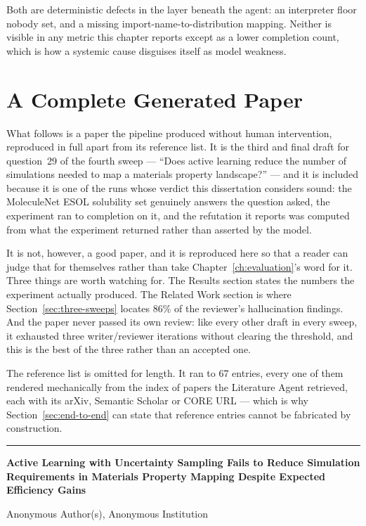 Both are deterministic defects in the layer beneath the agent: an interpreter floor
nobody set, and a missing import-name-to-distribution mapping. Neither is visible in
any metric this chapter reports except as a lower completion count, which is how a
systemic cause disguises itself as model weakness.


\chapter{A Complete Generated Paper}
\label{app:generated-paper}

What follows is a paper the pipeline produced without human intervention,
reproduced in full apart from its reference list. It is the third and final
draft for question~29 of the fourth sweep --- ``Does active learning reduce the
number of simulations needed to map a materials property landscape?'' --- and it
is included because it is one of the runs whose verdict this dissertation
considers sound: the MoleculeNet ESOL solubility set genuinely answers the
question asked, the experiment ran to completion on it, and the refutation it
reports was computed from what the experiment returned rather than asserted by
the model.

It is not, however, a good paper, and it is reproduced here so that a reader can
judge that for themselves rather than take Chapter~\ref{ch:evaluation}'s word for
it. Three things are worth watching for. The Results section states the numbers
the experiment actually produced. The Related Work section is where
Section~\ref{sec:three-sweeps} locates 86\% of the reviewer's hallucination
findings. And the paper never passed its own review: like every other draft in
every sweep, it exhausted three writer/reviewer iterations without clearing the
threshold, and this is the best of the three rather than an accepted one.

The reference list is omitted for length. It ran to 67 entries, every one of
them rendered mechanically from the index of papers the Literature Agent
retrieved, each with its arXiv, Semantic Scholar or CORE URL --- which is why
Section~\ref{sec:end-to-end} can state that reference entries cannot be
fabricated by construction.

\bigskip
\hrule
\bigskip

\begin{center}
{\large\bfseries Active Learning with Uncertainty Sampling Fails to Reduce
Simulation Requirements in Materials Property Mapping Despite Expected
Efficiency Gains\par}
\vspace{0.4em}
{\small Anonymous Author(s), Anonymous Institution\par}
\end{center}

